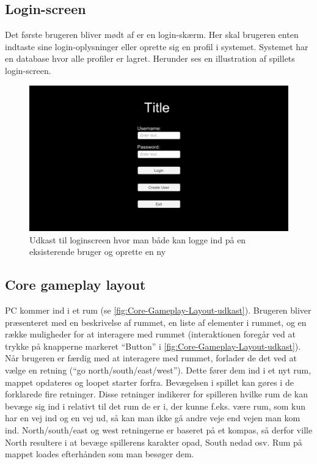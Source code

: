 \subsection{Login-screen}
Det første brugeren bliver mødt af er en login-skærm. Her skal brugeren enten indtaste sine login-oplysninger eller oprette sig en profil i systemet. Systemet har en database hvor alle profiler er lagret. Herunder ses en illustration af spillets login-screen. 

\begin{figure}[H]
\centering
\includegraphics[width = \textwidth]{02-Body/Images/Loginscreen-udkast.png}
\caption{Udkast til loginscreen hvor man både kan logge ind på en eksisterende bruger og oprette en ny}
\label{fig:Loginscreen-udkast}
\end{figure}

\subsection{Core gameplay layout}
PC kommer ind i et rum (se \autoref{fig:Core-Gameplay-Layout-udkast}). Brugeren bliver præsenteret med en beskrivelse af rummet, en liste af elementer i rummet, og en række muligheder for at interagere med rummet (interaktionen foregår ved at trykke på knapperne markeret “Button” i \autoref{fig:Core-Gameplay-Layout-udkast}). Når brugeren er færdig med at interagere med rummet, forlader de det ved at vælge en retning (“go north/south/east/west”). 
Dette fører dem ind i et nyt rum, mappet opdateres og loopet starter forfra.
Bevægelsen i spillet kan gøres i de forklarede fire retninger. Disse retninger indikerer for spilleren hvilke rum de kan bevæge sig ind i relativt til det rum de er i, der kunne f.eks. være rum, som kun har en vej ind og en vej ud, så kan man ikke gå andre veje end vejen man kom ind. North/south/east og west retningerne er baseret på et kompas, så derfor ville North resultere i at bevæge spillerens karakter opad, South nedad osv.
Rum på mappet loades efterhånden som man besøger dem.

